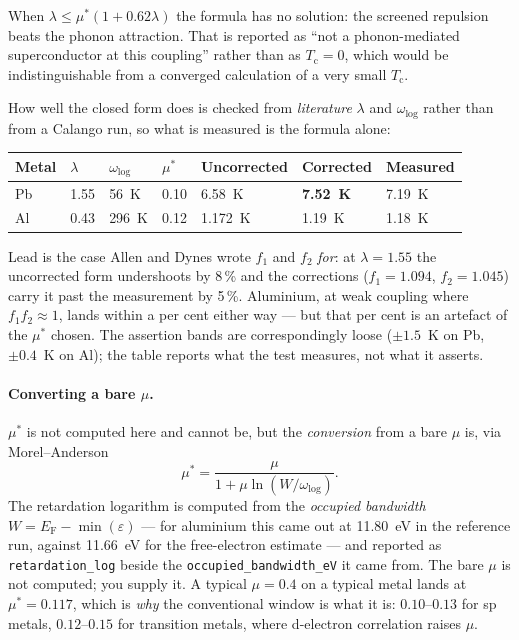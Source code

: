 When $\lambda \le \mu^*(1+0.62\lambda)$ the formula has no solution: the
screened repulsion beats the phonon attraction. That is reported as ``not a
phonon-mediated superconductor at this coupling'' rather than as
$T_\mathrm{c} = 0$, which would be indistinguishable from a converged
calculation of a very small $T_\mathrm{c}$.

How well the closed form does is checked from \emph{literature} $\lambda$ and
$\omega_{\log}$ rather than from a Calango run, so what is measured is the
formula alone:

\begin{center}
\small
\begin{tabular}{@{}lllllll@{}}
\toprule
Metal & $\lambda$ & $\omega_{\log}$ & $\mu^*$ & Uncorrected & Corrected & Measured \\
\midrule
Pb & 1.55 & 56~K  & 0.10 & 6.58~K & \textbf{7.52~K} & 7.19~K \\
Al & 0.43 & 296~K & 0.12 & 1.172~K & 1.19~K & 1.18~K \\
\bottomrule
\end{tabular}
\end{center}

Lead is the case Allen and Dynes wrote $f_1$ and $f_2$ \emph{for}: at
$\lambda = 1.55$ the uncorrected form undershoots by 8\,\% and the corrections
($f_1 = 1.094$, $f_2 = 1.045$) carry it past the measurement by 5\,\%.
Aluminium, at weak coupling where $f_1 f_2 \approx 1$, lands within a per cent
either way --- but that per cent is an artefact of the $\mu^*$ chosen. The
assertion bands are correspondingly loose ($\pm 1.5$~K on Pb, $\pm 0.4$~K on
Al); the table reports what the test measures, not what it asserts.

\paragraph{Converting a bare $\mu$.} $\mu^*$ is not computed here and cannot be,
but the \emph{conversion} from a bare $\mu$ is, via Morel--Anderson
\begin{equation}
  \mu^* = \frac{\mu}{1 + \mu \ln(W/\omega_{\log})} .
\end{equation}
The retardation logarithm is computed from the \emph{occupied bandwidth}
$W = E_\mathrm{F} - \min(\varepsilon)$ --- for aluminium this came out at
11.80~eV in the reference run, against 11.66~eV for the free-electron estimate
--- and reported as \texttt{retardation\_log} beside the
\texttt{occupied\_bandwidth\_eV} it came from. The bare $\mu$ is not computed;
you supply it. A typical $\mu = 0.4$ on a typical metal lands at
$\mu^* = 0.117$, which is \emph{why} the conventional window is what it is:
$0.10$--$0.13$ for sp metals, $0.12$--$0.15$ for transition metals, where
d-electron correlation raises $\mu$.

